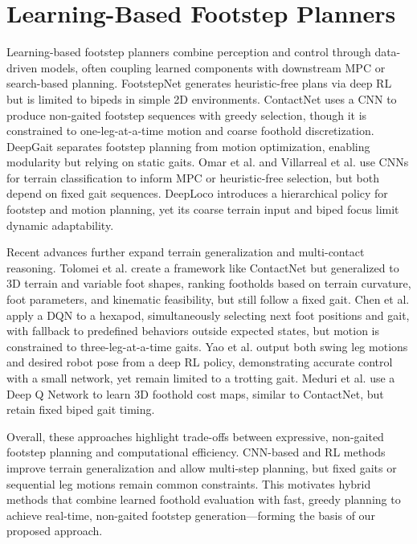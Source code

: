 \section{Learning-Based Footstep Planners}
\label{sec:learning-based-footstep-planners}

Learning-based footstep planners combine perception and control
through data-driven models, often coupling learned components with
downstream MPC or search-based planning. FootstepNet
\cite{gaspard_footstepnet_2024} generates heuristic-free plans via
deep RL but is limited to bipeds in simple 2D environments.
ContactNet \cite{bratta_contactnet_2024} uses a CNN to produce
non-gaited footstep sequences with greedy selection, though it is
constrained to one-leg-at-a-time motion and coarse foothold
discretization. DeepGait \cite{tsounis_deepgait_2020} separates
footstep planning from motion optimization, enabling modularity but
relying on static gaits. Omar et al. \cite{omar_fast_2022} and
Villarreal et al. \cite{villarreal_fast_2019} use CNNs for terrain
classification to inform MPC or heuristic-free selection, but both
depend on fixed gait sequences. DeepLoco \cite{peng_deeploco_2017}
introduces a hierarchical policy for footstep and motion planning,
yet its coarse terrain input and biped focus limit dynamic adaptability.

Recent advances further expand terrain generalization and
multi-contact reasoning. Tolomei et al.
\cite{tolomei_learning-based_2025} create a framework like ContactNet
but generalized to 3D terrain and variable foot shapes, ranking
footholds based on terrain curvature, foot parameters, and kinematic
feasibility, but still follow a fixed gait. Chen et al.
\cite{chen_gait_2024} apply a DQN to a hexapod, simultaneously
selecting next foot positions and gait, with fallback to predefined
behaviors outside expected states, but motion is constrained to
three-leg-at-a-time gaits. Yao et al. \cite{yao_hierarchical_2021}
output both swing leg motions and desired robot pose from a deep RL
policy, demonstrating accurate control with a small network, yet
remain limited to a trotting gait. Meduri et al.
\cite{meduri_deepq_2021} use a Deep Q Network to learn 3D foothold
cost maps, similar to ContactNet, but retain fixed biped gait timing.

Overall, these approaches highlight trade-offs between expressive,
non-gaited footstep planning and computational efficiency. CNN-based
and RL methods improve terrain generalization and allow multi-step
planning, but fixed gaits or sequential leg motions remain common
constraints. This motivates hybrid methods that combine learned
foothold evaluation with fast, greedy planning to achieve real-time,
non-gaited footstep generation—forming the basis of our proposed approach.
